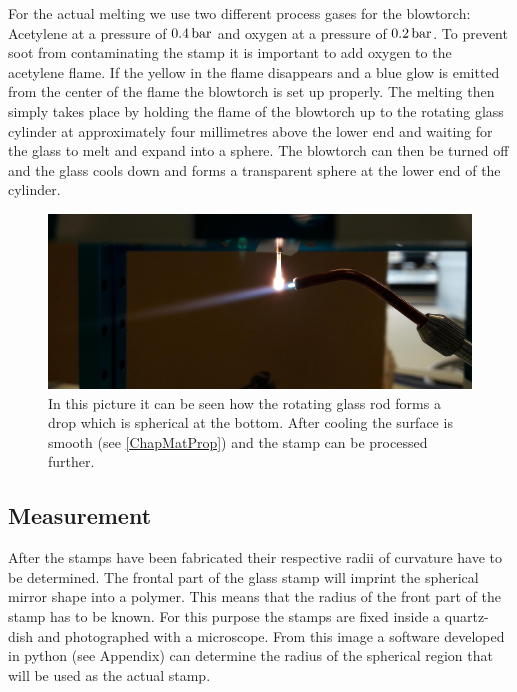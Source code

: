 For the actual melting we use two different process gases for the blowtorch: Acetylene at a pressure of $0.4\cbar$ and oxygen at a pressure of $0.2\cbar$. To prevent soot from contaminating the stamp it is important to add oxygen to the acetylene flame. If the yellow in the flame disappears and a blue glow is emitted from the center of the flame the blowtorch is set up properly. The melting then simply takes place by holding the flame of the blowtorch up to the rotating glass cylinder at approximately four millimetres above the lower end and waiting for the glass to melt and expand into a sphere. The blowtorch can then be turned off and the glass cools down and forms a transparent sphere at the lower end of the cylinder.
\begin{figure}[H]
	\includegraphics[scale=0.5]{source/melting_compressed}
	\caption{In this picture it can be seen how the rotating glass rod forms a drop which is spherical at the bottom. After cooling the surface is smooth (see \autoref{ChapMatProp}) and the stamp can be processed further.}
\end{figure}

\subsection{Measurement}\label{ChapMeasurement}
After the stamps have been fabricated their respective radii of curvature have to be determined. The frontal part of the glass stamp will imprint the spherical mirror shape into a polymer. This means that the radius of the front part of the stamp has to be known. For this purpose the stamps are fixed inside a quartz-dish and photographed with a microscope. From this image a software developed in python (see Appendix) can determine the radius of the spherical region that will be used as the actual stamp.

